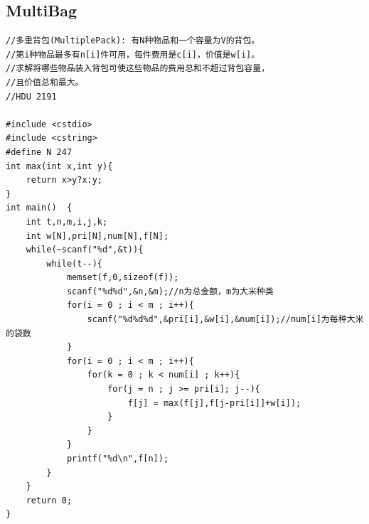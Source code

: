 \documentclass[twoside]{article}
\begin{document}
\subsection{MultiBag}
\begin{lstlisting}
//多重背包(MultiplePack): 有N种物品和一个容量为V的背包。  
//第i种物品最多有n[i]件可用，每件费用是c[i]，价值是w[i]。  
//求解将哪些物品装入背包可使这些物品的费用总和不超过背包容量，  
//且价值总和最大。  
//HDU 2191  
  
#include <cstdio>  
#include <cstring>  
#define N 247  
int max(int x,int y){
    return x>y?x:y;  
}  
int main()  {  
    int t,n,m,i,j,k;  
    int w[N],pri[N],num[N],f[N];  
    while(~scanf("%d",&t)){  
        while(t--){  
            memset(f,0,sizeof(f));  
            scanf("%d%d",&n,&m);//n为总金额，m为大米种类  
            for(i = 0 ; i < m ; i++){  
                scanf("%d%d%d",&pri[i],&w[i],&num[i]);//num[i]为每种大米的袋数  
            }  
            for(i = 0 ; i < m ; i++){  
                for(k = 0 ; k < num[i] ; k++){  
                    for(j = n ; j >= pri[i]; j--){  
                        f[j] = max(f[j],f[j-pri[i]]+w[i]);  
                    }  
                }  
            }  
            printf("%d\n",f[n]);  
        }  
    }  
    return 0;  
}  \end{lstlisting}
\end{document}
